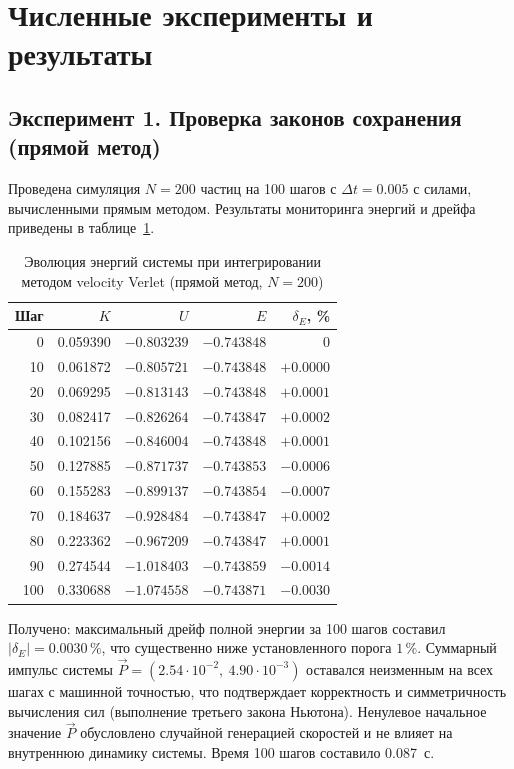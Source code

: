 \documentclass[12pt,a4paper]{article}
\begin{document}
	\section{Численные эксперименты и результаты}
	
	\subsection{Эксперимент 1. Проверка законов сохранения (прямой метод)}
	
	Проведена симуляция $N = 200$ частиц на 100 шагов с $\Delta t = 0.005$ с силами, вычисленными прямым методом. Результаты мониторинга энергий и дрейфа приведены в таблице~\ref{tab:energy}.
	
	\begin{table}[h]
		\centering
		\caption{Эволюция энергий системы при интегрировании методом velocity Verlet (прямой метод, $N=200$)}
		\label{tab:energy}
		\begin{tabular}{rrrrr}
			\toprule
			Шаг & $K$ & $U$ & $E$ & $\delta_E$, \% \\
			\midrule
			0   & 0.059390 & $-0.803239$ & $-0.743848$ & 0 \\
			10  & 0.061872 & $-0.805721$ & $-0.743848$ & $+0.0000$ \\
			20  & 0.069295 & $-0.813143$ & $-0.743848$ & $+0.0001$ \\
			30  & 0.082417 & $-0.826264$ & $-0.743847$ & $+0.0002$ \\
			40  & 0.102156 & $-0.846004$ & $-0.743848$ & $+0.0001$ \\
			50  & 0.127885 & $-0.871737$ & $-0.743853$ & $-0.0006$ \\
			60  & 0.155283 & $-0.899137$ & $-0.743854$ & $-0.0007$ \\
			70  & 0.184637 & $-0.928484$ & $-0.743847$ & $+0.0002$ \\
			80  & 0.223362 & $-0.967209$ & $-0.743847$ & $+0.0001$ \\
			90  & 0.274544 & $-1.018403$ & $-0.743859$ & $-0.0014$ \\
			100 & 0.330688 & $-1.074558$ & $-0.743871$ & $-0.0030$ \\
			\bottomrule
		\end{tabular}
	\end{table}
	
	Получено: максимальный дрейф полной энергии за 100 шагов составил $|\delta_E| = 0.0030\,\%$, что существенно ниже установленного порога $1\,\%$. Суммарный импульс системы $\vec P = (2.54\cdot10^{-2},\ 4.90\cdot10^{-3})$ оставался неизменным на всех шагах с машинной точностью, что подтверждает корректность и симметричность вычисления сил (выполнение третьего закона Ньютона). Ненулевое начальное значение $\vec P$ обусловлено случайной генерацией скоростей и не влияет на внутреннюю динамику системы. Время 100 шагов составило 0.087~с.
	
\end{document}
